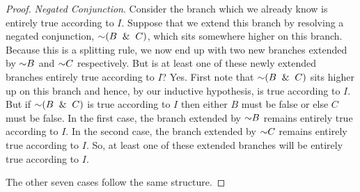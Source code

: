 \documentclass[options]{philosophersimprint}
\begin{document}
\begin{proof}
\textit{Negated Conjunction}. Consider the branch which we already know is entirely true according to $I$. Suppose that we extend this branch by resolving a negated conjunction, $\mathord{\sim} (B \ \mathbin{\&} \  C)$, which sits somewhere higher on this branch. Because this is a splitting rule, we now end up with two new branches extended by $\mathord{\sim} B$ and $\mathord{\sim} C$ respectively. But is at least one of these newly extended branches entirely true according to $I$? Yes. First note that $\mathord{\sim} (B \ \mathbin{\&} \  C)$ sits higher up on this branch and hence, by our inductive hypothesis, is true according to $I$. But if $\mathord{\sim} (B \ \mathbin{\&} \  C)$ is true according to $I$ then either $B$ must be false or else $C$ must be false. In the first case, the branch extended by $\mathord{\sim} B$ remains entirely true according to $I$. In the second case, the branch extended by $\mathord{\sim} C$ remains entirely true according to $I$. So, at least one of these extended branches will be entirely true according to $I$.

The other seven cases follow the same structure.
\end{proof}
\end{document}
